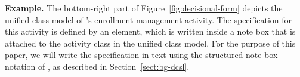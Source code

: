\noindent \textbf{Example.} 
The bottom-right part of Figure~\ref{fig:decisional-form} depicts the unified class model of \courseman's enrollment management activity. The \agl specification for this activity is defined by an  element, which is written inside a note box that is attached to the  activity class in the unified class model. For the purpose of this paper, we will write the \agl specification in text using the structured note box notation of \dcsl, as described in Section~\ref{sect:bg-dcsl}.


